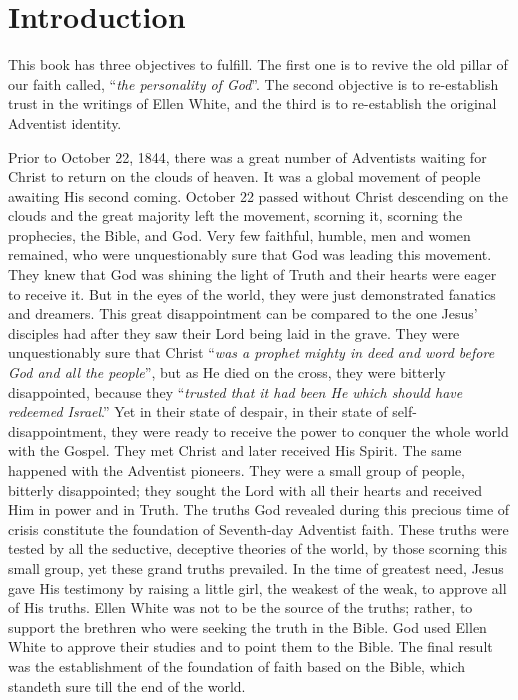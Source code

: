 \chapter*{Introduction}

This book has three objectives to fulfill. The first one is to revive the old pillar of our faith called, “\textit{the personality of God}”. The second objective is to re-establish trust in the writings of Ellen White, and the third is to re-establish the original Adventist identity.

Prior to October 22, 1844, there was a great number of Adventists waiting for Christ to return on the clouds of heaven. It was a global movement of people awaiting His second coming. October 22 passed without Christ descending on the clouds and the great majority left the movement, scorning it, scorning the prophecies, the Bible, and God. Very few faithful, humble, men and women remained, who were unquestionably sure that God was leading this movement. They knew that God was shining the light of Truth and their hearts were eager to receive it. But in the eyes of the world, they were just demonstrated fanatics and dreamers. This great disappointment can be compared to the one Jesus’ disciples had after they saw their Lord being laid in the grave. They were unquestionably sure that Christ “\textit{was a prophet mighty in deed and word before God and all the people}”, but as He died on the cross, they were bitterly disappointed, because they “\textit{trusted that it had been He which should have redeemed Israel}.” Yet in their state of despair, in their state of self-disappointment, they were ready to receive the power to conquer the whole world with the Gospel. They met Christ and later received His Spirit. The same happened with the Adventist pioneers. They were a small group of people, bitterly disappointed; they sought the Lord with all their hearts and received Him in power and in Truth. The truths God revealed during this precious time of crisis constitute the foundation of Seventh-day Adventist faith. These truths were tested by all the seductive, deceptive theories of the world, by those scorning this small group, yet these grand truths prevailed. In the time of greatest need, Jesus gave His testimony by raising a little girl, the weakest of the weak, to approve all of His truths. Ellen White was not to be the source of the truths; rather, to support the brethren who were seeking the truth in the Bible. God used Ellen White to approve their studies and to point them to the Bible. The final result was the establishment of the foundation of faith based on the Bible, which standeth sure till the end of the world.

